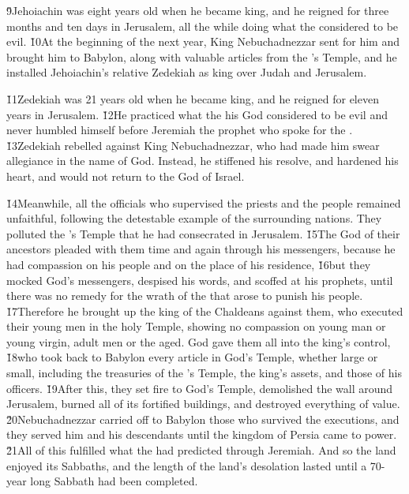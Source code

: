 \v{9}Jehoiachin was eight years old when he became king, and he reigned for three months and ten days in Jerusalem, all the while doing what the  considered to be evil. \v{10}At the beginning of the next year, King Nebuchadnezzar sent for him and brought him to Babylon, along with valuable articles from the 's Temple, and he installed Jehoiachin's relative Zedekiah as king over Judah and Jerusalem.

\v{11}Zedekiah was 21 years old when he became king, and he reigned for eleven years in Jerusalem. \v{12}He practiced what the  his God considered to be evil and never humbled himself before Jeremiah the prophet who spoke for the . \v{13}Zedekiah rebelled against King Nebuchadnezzar, who had made him swear allegiance in the name of God. Instead, he stiffened his resolve, and hardened his heart, and would not return to the  God of Israel.

\v{14}Meanwhile, all the officials who supervised the priests and the people remained unfaithful, following the detestable example of the surrounding nations. They polluted the 's Temple that he had consecrated in Jerusalem. \v{15}The  God of their ancestors pleaded with them time and again through his messengers, because he had compassion on his people and on the place of his residence, \v{16}but they mocked God's messengers, despised his words, and scoffed at his prophets, until there was no remedy for the wrath of the  that arose to punish his people. \v{17}Therefore he brought up the king of the Chaldeans against them, who executed their young men in the holy Temple, showing no compassion on young man or young virgin, adult men or the aged. God gave them all into the king's control, \v{18}who took back to Babylon every article in God's Temple, whether large or small, including the treasuries of the 's Temple, the king's assets, and those of his officers. \v{19}After this, they set fire to God's Temple, demolished the wall around Jerusalem, burned all of its fortified buildings, and destroyed everything of value. \v{20}Nebuchadnezzar carried off to Babylon those who survived the executions, and they served him and his descendants until the kingdom of Persia came to power. \v{21}All of this fulfilled what the  had predicted through Jeremiah. And so the land enjoyed its Sabbaths, and the length of the land's desolation lasted until a 70-year long Sabbath had been completed.

